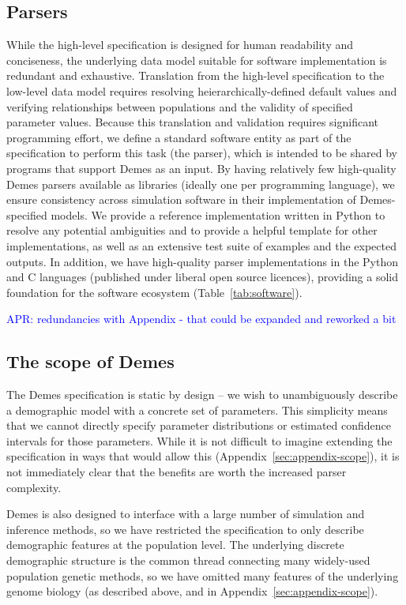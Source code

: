 \documentclass[11pt]{article}
\newcommand{\aprcomment}[1]{{\textcolor{blue}{APR: #1}}}
\begin{document}
\subsection*{Parsers}

While the high-level specification is designed for human readability and
conciseness, the underlying data model suitable for software implementation
is redundant and exhaustive. 
Translation from the high-level specification to the low-level data model
requires resolving heierarchically-defined default values and verifying
relationships between populations and the validity of specified parameter
values.
Because this translation and validation requires significant
programming effort, we define a standard software entity as part of the
specification to perform this task (the parser),
which is intended to be shared by programs that support Demes as an input.
By having relatively few high-quality Demes parsers available as libraries
(ideally one per programming language), we ensure consistency across simulation
software in their implementation of Demes-specified models.
We provide a reference implementation written in Python to resolve any
potential ambiguities and to provide a helpful template for other
implementations, as well as an extensive test suite of examples and the
expected outputs.
In addition, we have high-quality parser implementations in the Python and
C languages (published under liberal open source licences), providing a
solid foundation for the software ecosystem (Table~\ref{tab:software}).

\aprcomment{redundancies with Appendix - that could be expanded and reworked a bit}

\subsection*{The scope of Demes}

The Demes specification is static by design -- we wish to unambiguously
describe a demographic model with a concrete set of parameters.
This simplicity means that we cannot directly specify parameter distributions
or estimated confidence intervals for those parameters.
While it is not difficult to imagine extending the specification in ways that
would allow this (Appendix~\ref{sec:appendix-scope}), it is not immediately
clear that the benefits are worth the increased parser complexity.

Demes is also designed to interface with a large number of simulation and
inference methods, so we have restricted the specification to only
describe demographic features at the population level.
The underlying discrete demographic structure is the common thread connecting
many widely-used population genetic methods, so we have omitted many
features of the underlying genome biology (as described above, and in
Appendix~\ref{sec:appendix-scope}).
\end{document}
